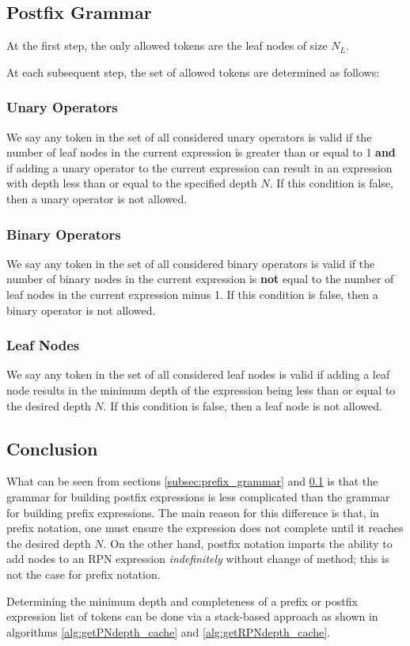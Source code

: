 \documentclass[runningheads]{llncs}
\begin{document}
\subsection{Postfix Grammar}\label{subsec:postfix_grammar}
At the first step, the only allowed tokens are the leaf nodes of size $N_L$.
\par At each subsequent step, the set of allowed tokens are determined as follows:
\subsubsection{Unary Operators}
We say any token in the set of all considered unary operators is valid if the number of leaf nodes in the current expression is greater than or equal to 1 \textbf{and} if adding a unary operator to the current expression can result in an expression with depth less than or equal to the specified depth $N$. If this condition is false, then a unary operator is not allowed.
\subsubsection{Binary Operators}
We say any token in the set of all considered binary operators is valid if the number of binary nodes in the current expression is \textbf{not} equal to the number of leaf nodes in the current expression minus 1. If this condition is false, then a binary operator is not allowed.
\subsubsection{Leaf Nodes}
We say any token in the set of all considered leaf nodes is valid if adding a leaf node results in the minimum depth of the expression being less than or equal to the desired depth $N$. If this condition is false, then a leaf node is not allowed.

\subsection{Conclusion}
What can be seen from sections \ref{subsec:prefix_grammar} and \ref{subsec:postfix_grammar} is that the grammar for building postfix expressions is less complicated than the grammar for building prefix expressions. The main reason for this difference is that, in prefix notation, one must ensure the expression does not complete until it reaches the desired depth $N$. On the other hand, postfix notation imparts the ability to add nodes to an RPN expression \emph{indefinitely} without change of method; this is not the case for prefix notation. \par Determining the minimum depth and completeness of a prefix or postfix expression list of tokens can be done via a stack-based approach as shown in algorithms \ref{alg:getPNdepth_cache} and \ref{alg:getRPNdepth_cache}.
\end{document}
